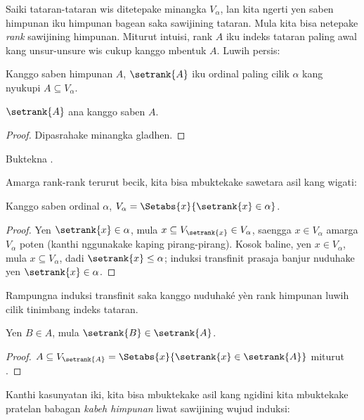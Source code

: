 \documentclass[../../../include/open-logic-section]{subfiles}
\begin{document}

Saiki tataran-tataran wis ditetepake minangka
$V_\alpha$, lan kita ngerti yen saben himpunan
iku himpunan bagean saka sawijining tataran.
Mula kita bisa netepake \emph{rank} sawijining
himpunan. Miturut intuisi, rank $A$ iku indeks
tataran paling awal kang unsur-unsure wis cukup
kanggo mbentuk $A$. Luwih persis:

\begin{defn}
Kanggo saben himpunan $A$, $\setrank{A}$ iku
ordinal paling cilik $\alpha$ kang nyukupi
$A \subseteq V_\alpha$.
\end{defn}
\begin{prop}
	$\setrank{A}$ ana kanggo saben $A$.
\end{prop}
\begin{proof}
	Dipasrahake minangka gladhen.
\end{proof}
\begin{prob}
	Buktekna .
\end{prob}
\noindent 
Amarga rank-rank terurut becik, kita bisa
mbuktekake sawetara asil kang wigati:
\begin{prop}
Kanggo saben ordinal $\alpha$,
$V_\alpha = \Setabs{x}{\setrank{x} \in \alpha}$.
\end{prop}

\begin{proof}
Yen $\setrank{x} \in \alpha$, mula
$x \subseteq V_{\setrank{x}} \in V_\alpha$,
saengga $x \in V_\alpha$ amarga $V_\alpha$
poten (kanthi nggunakake
 kaping pirang-pirang).
Kosok baline, yen $x \in V_\alpha$, mula
$x \subseteq V_\alpha$, dadi
$\setrank{x} \leq \alpha$; induksi transfinit
prasaja banjur nuduhake yen
$\setrank{x} \in \alpha$.
\end{proof}
\begin{prob}
Rampungna induksi transfinit saka 
kanggo nuduhaké yèn rank himpunan luwih cilik tinimbang indeks tataran.
\end{prob}

\begin{prop}
Yen $B \in A$, mula $\setrank{B} \in \setrank{A}$.
\end{prop}

\begin{proof}
$A \subseteq V_{\setrank{A}} = \Setabs{x}{\setrank{x} \in
\setrank{A}}$ miturut .
\end{proof}
\noindent
Kanthi kasunyatan iki, kita bisa mbuktekake
asil kang ngidini kita mbuktekake pratelan
babagan \emph{kabeh himpunan} liwat sawijining
wujud induksi:
\end{document}
